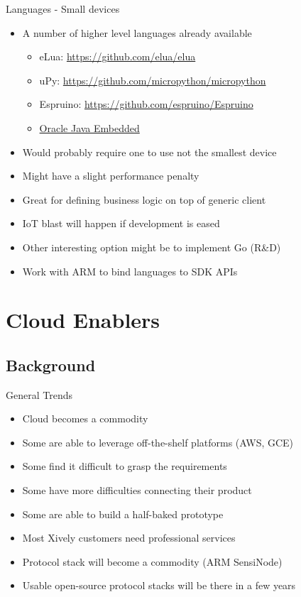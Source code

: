 \documentclass{beamer}
\begin{document}
\begin{frame}{Languages - Small devices}
\begin{itemize}
  \item A number of higher level languages already available
  \begin{itemize}
    \item eLua: \url{https://github.com/elua/elua}
    \item uPy: \url{https://github.com/micropython/micropython}
    \item Espruino: \url{https://github.com/espruino/Espruino}
    \item \href{http://www.oracle.com/technetwork/java/embedded}{Oracle Java Embedded}
  \end{itemize}
  \item Would probably require one to use not the smallest device
  \item Might have a slight performance penalty
  \item Great for defining business logic on top of generic client
  \item IoT blast will happen if development is eased
  \item Other interesting option might be to implement Go (R\&D)
  \item Work with ARM to bind languages to SDK APIs
\end{itemize}
\end{frame}

\section{Cloud Enablers}
\subsection{Background}

\begin{frame}{General Trends}
\begin{itemize}
  \item Cloud becomes a commodity 
  \item Some are able to leverage off-the-shelf platforms (AWS, GCE)
  \item Some find it difficult to grasp the requirements
  \item Some have more difficulties connecting their product
  \item Some are able to build a half-baked prototype
  \item Most Xively customers need professional services
  \item Protocol stack will become a commodity (ARM SensiNode)
  \item Usable open-source protocol stacks will be there in a few years
\end{itemize}
\end{frame}
\end{document}
